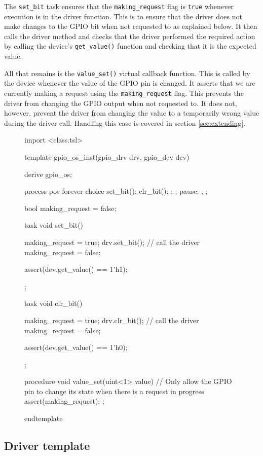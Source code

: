 \documentclass{article}
\newcommand{\code}[1]{\texttt{#1}}
\begin{document}
The \code{set\_bit} task ensures that the \code{making\_request} flag is \code{true} whenever execution is in the driver function. This is to ensure that the driver does not make changes to the GPIO bit when not requested to as explained below. It then calls the driver method and checks that the driver performed the required action by calling the device's \code{get\_value()} function and checking that it is the expected value.

All that remains is the \code{value\_set()} virtual callback function. This is called by the device whenever the value of the GPIO pin is changed. It asserts that we are currently making a request using the \code{making\_request} flag. This prevents the driver from changing the GPIO output when not requested to. It does not, however, prevent the driver from changing the value to a temporarily wrong value during the driver call. Handling this case is covered in section \ref{sec:extending}.

\begin{figure}[H]
\lstset{numbers=left}
\begin{tsllisting}
import <class.tsl>

template gpio_os_inst(gpio_drv drv, gpio_dev dev)

derive gpio_os;

process pos {
    forever{
        choice{       
            set_bit();
            clr_bit();
            {};      
        };
        pause;      
    };
};

bool making_request = false;

task void set_bit(){
    making_request = true;
    drv.set_bit(); // call the driver
    making_request = false;

    assert(dev.get_value() == 1'h1);
};

task void clr_bit(){
    making_request = true;
    drv.clr_bit(); // call the driver
    making_request = false;

    assert(dev.get_value() == 1'h0);
};

procedure void value_set(uint<1> value){
    // Only allow the GPIO pin to change its state when there is a request in progress
    assert(making_request);
};

endtemplate
\end{tsllisting}
\end{figure}

\subsection{Driver template}
\end{document}
